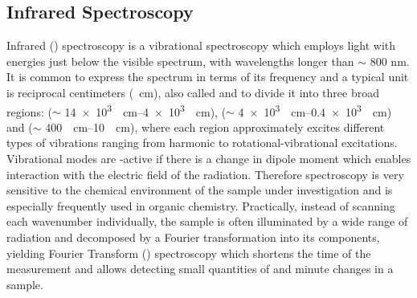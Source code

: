 \subsection{Infrared Spectroscopy}
Infrared (\ir{}) spectroscopy is a vibrational spectroscopy which employs light with energies just below the visible spectrum, \ie{} with wavelengths longer than $\sim$ 800 nm. It is common to express the spectrum in terms of its frequency and a typical unit is reciprocal centimeters (\si{\per\centi\metre}), also called  and to divide it into three broad regions:  ($\sim$ \SIrange{14e3}{4e3}{\per\centi\metre}),  ($\sim$ \SIrange{4e3}{0.4e3}{\per\centi\metre}) and  ($\sim$ \SIrange{400}{10}{\per\centi\metre}), where each region approximately excites different types of vibrations ranging from harmonic to rotational-vibrational excitations. Vibrational modes are \ir{}-active if there is a change in dipole moment which enables interaction with the electric field of the radiation. Therefore \ir{} spectroscopy is very sensitive to the chemical environment of the sample under investigation and is especially frequently used in organic chemistry. Practically, instead of scanning each wavenumber individually, the sample is often illuminated by a wide range of radiation and decomposed by a Fourier transformation into its components, yielding Fourier Transform \ir{} (\ftir{}) spectroscopy which shortens the time of the measurement and allows detecting small quantities of and minute changes in a sample.\\%
%
